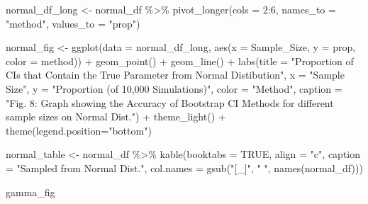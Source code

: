 \documentclass[12pt]{article}
\newenvironment{Shaded}{\begin{snugshade}}{\end{snugshade}}
\newcommand{\AttributeTok}[1]{\textcolor[rgb]{0.77,0.63,0.00}{#1}}
\newcommand{\ConstantTok}[1]{\textcolor[rgb]{0.00,0.00,0.00}{#1}}
\newcommand{\DecValTok}[1]{\textcolor[rgb]{0.00,0.00,0.81}{#1}}
\newcommand{\FunctionTok}[1]{\textcolor[rgb]{0.00,0.00,0.00}{#1}}
\newcommand{\NormalTok}[1]{#1}
\newcommand{\OtherTok}[1]{\textcolor[rgb]{0.56,0.35,0.01}{#1}}
\newcommand{\SpecialCharTok}[1]{\textcolor[rgb]{0.00,0.00,0.00}{#1}}
\newcommand{\StringTok}[1]{\textcolor[rgb]{0.31,0.60,0.02}{#1}}
\begin{document}
\begin{Shaded}
\begin{Highlighting}[]
\NormalTok{normal\_df\_long }\OtherTok{\textless{}{-}}\NormalTok{ normal\_df }\SpecialCharTok{\%\textgreater{}\%}
  \FunctionTok{pivot\_longer}\NormalTok{(}\AttributeTok{cols =} \DecValTok{2}\SpecialCharTok{:}\DecValTok{6}\NormalTok{, }\AttributeTok{names\_to =} \StringTok{"method"}\NormalTok{, }\AttributeTok{values\_to =} \StringTok{"prop"}\NormalTok{) }
    
\NormalTok{normal\_fig }\OtherTok{\textless{}{-}} \FunctionTok{ggplot}\NormalTok{(}\AttributeTok{data =}\NormalTok{ normal\_df\_long, }
                    \FunctionTok{aes}\NormalTok{(}\AttributeTok{x =}\NormalTok{ Sample\_Size, }\AttributeTok{y =}\NormalTok{ prop, }\AttributeTok{color =}\NormalTok{ method)) }\SpecialCharTok{+} 
  \FunctionTok{geom\_point}\NormalTok{() }\SpecialCharTok{+} \FunctionTok{geom\_line}\NormalTok{() }\SpecialCharTok{+} 
  \FunctionTok{labs}\NormalTok{(}\AttributeTok{title =} \StringTok{"Proportion of CIs that Contain the True Parameter from Normal }
\StringTok{       Distibution"}\NormalTok{, }\AttributeTok{x =} \StringTok{"Sample Size"}\NormalTok{, }
       \AttributeTok{y =} \StringTok{"Proportion (of 10,000 Simulations)"}\NormalTok{, }\AttributeTok{color =} \StringTok{"Method"}\NormalTok{,}
       \AttributeTok{caption =} \StringTok{"Fig. 8: Graph showing the Accuracy of Bootstrap CI Methods for different sample sizes on Normal Dist."}\NormalTok{) }\SpecialCharTok{+}
  \FunctionTok{theme\_light}\NormalTok{() }\SpecialCharTok{+}
  \FunctionTok{theme}\NormalTok{(}\AttributeTok{legend.position=}\StringTok{"bottom"}\NormalTok{)}
      
\NormalTok{normal\_table }\OtherTok{\textless{}{-}}\NormalTok{ normal\_df }\SpecialCharTok{\%\textgreater{}\%}
  \FunctionTok{kable}\NormalTok{(}\AttributeTok{booktabs =} \ConstantTok{TRUE}\NormalTok{, }\AttributeTok{align =} \StringTok{"c"}\NormalTok{, }\AttributeTok{caption =} \StringTok{"Sampled from Normal Dist."}\NormalTok{, }
        \AttributeTok{col.names =} \FunctionTok{gsub}\NormalTok{(}\StringTok{"[\_]"}\NormalTok{, }\StringTok{" "}\NormalTok{, }\FunctionTok{names}\NormalTok{(normal\_df)))}
\end{Highlighting}
\end{Shaded}

\begin{Shaded}
\begin{Highlighting}[]
\NormalTok{gamma\_fig}
\end{Highlighting}
\end{Shaded}
\end{document}
